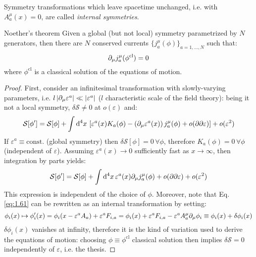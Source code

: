 Symmetry transformations which leave spacetime unchanged, i.e. with $ A^\mu_a(x) = 0 $, are called \textit{internal symmetries}.

\begin{theorem}{Noether's theorem}{}
  Given a global (but not local) symmetry parametrized by $ N $ generators, then there are $ N $ conserved currents $ \{j^\mu_a(\phi)\}_{a = 1, \dots, N} $ such that:
  \begin{equation}
    \partial_\mu j^\mu_a(\phi^\mathrm{cl}) = 0
    \label{eq:1.66}
  \end{equation}
  where $ \phi^\mathrm{cl} $ is a classical solution of the equations of motion.

  \tcblower

  \begin{proof}
    First, consider an infinitesimal transformation with slowly-varying parameters, i.e. $ l \left\lvert\partial_\mu \varepsilon^a\right\rvert \ll \left\lvert\varepsilon^a\right\rvert $ ($ l $ characteristic scale of the field theory): being it not a local symmetry, $ \delta \mathcal{S} \neq 0 $ at $ o(\varepsilon) $ and:
    \begin{equation*}
      \mathcal{S}[\phi'] = \mathcal{S}[\phi] + \int \mathrm{d}^4 x\, \left[ \varepsilon^a(x) K_a(\phi) - \left( \partial_\mu \varepsilon^a(x) \right) j^\mu_a(\phi) + o(\partial \partial \varepsilon) \right] + o(\varepsilon^2)
    \end{equation*}
    If $ \varepsilon^a \equiv \mathrm{const.} $ (global symmetry) then $ \delta \mathcal{S}[\phi] = 0 \,\forall \phi $, therefore $ K_a(\phi) = 0 \,\forall \phi $ (independent of $ \varepsilon $). Assuming $ \varepsilon^a(x) \rightarrow 0 $ sufficiently fast as $ x \rightarrow \infty $, then integration by parts yields:
    \begin{equation*}
      \mathcal{S}[\phi'] = \mathcal{S}[\phi] + \int \mathrm{d}^4 x\, \varepsilon^a(x) \partial_\mu j^\mu_a(\phi) + o(\partial \partial \varepsilon) + o(\varepsilon^2)
    \end{equation*}
    This expression is independent of the choice of $ \phi $. Moreover, note that Eq. \ref{eq:1.61} can be rewritten as an internal transformation by setting:
    \begin{equation*}
      \phi_i(x) \mapsto \phi'_i(x) = \phi_i(x - \varepsilon^a A_a) + \varepsilon^a F_{i,a} = \phi_i(x) + \varepsilon^a F_{i,a} - \varepsilon^a A^\mu_a \partial_\mu \phi_i \equiv \phi_i(x) + \delta \phi_i(x)
    \end{equation*}
    $ \delta \phi_i(x) $ vanishes at infinity, therefore it is the kind of variation used to derive the equations of motion: choosing $ \phi \equiv \phi^\mathrm{cl} $ classical solution then implies $ \delta \mathcal{S} = 0 $ independently of $ \varepsilon $, i.e. the thesis.
  \end{proof}
\end{theorem}

